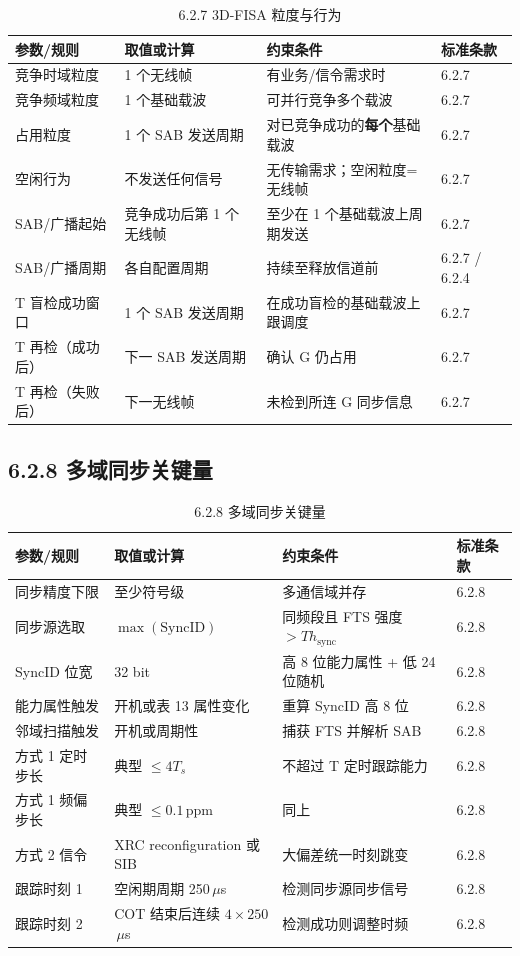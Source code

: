 \documentclass[11pt,a4paper]{ctexart}
\begin{document}
\begin{longtable}{L{3.2cm}L{3.5cm}L{5cm}L{2cm}}
\caption{6.2.7 3D-FISA 粒度与行为\label{tab:627-fisa}} \\
\toprule
\textbf{参数/规则} & \textbf{取值或计算} & \textbf{约束条件} & \textbf{标准条款} \\
\midrule
竞争时域粒度 & 1 个无线帧 & 有业务/信令需求时 & 6.2.7 \\
竞争频域粒度 & 1 个基础载波 & 可并行竞争多个载波 & 6.2.7 \\
占用粒度 & 1 个 SAB 发送周期 & 对已竞争成功的\textbf{每个}基础载波 & 6.2.7 \\
空闲行为 & 不发送任何信号 & 无传输需求；空闲粒度=无线帧 & 6.2.7 \\
SAB/广播起始 & 竞争成功后第 1 个无线帧 & 至少在 1 个基础载波上周期发送 & 6.2.7 \\
SAB/广播周期 & 各自配置周期 & 持续至释放信道前 & 6.2.7 / 6.2.4 \\
T 盲检成功窗口 & 1 个 SAB 发送周期 & 在成功盲检的基础载波上跟调度 & 6.2.7 \\
T 再检（成功后） & 下一 SAB 发送周期 & 确认 G 仍占用 & 6.2.7 \\
T 再检（失败后） & 下一无线帧 & 未检到所连 G 同步信息 & 6.2.7 \\
\bottomrule
\end{longtable}

\subsection{6.2.8 多域同步关键量}

\begin{longtable}{L{3.2cm}L{4cm}L{5cm}L{2cm}}
\caption{6.2.8 多域同步关键量\label{tab:628-sync}} \\
\toprule
\textbf{参数/规则} & \textbf{取值或计算} & \textbf{约束条件} & \textbf{标准条款} \\
\midrule
同步精度下限 & 至少符号级 & 多通信域并存 & 6.2.8 \\
同步源选取 & $\max(\mathrm{SyncID})$ & 同频段且 FTS 强度 $>Th_{\mathrm{sync}}$ & 6.2.8 \\
SyncID 位宽 & 32 bit & 高 8 位能力属性 + 低 24 位随机 & 6.2.8 \\
能力属性触发 & 开机或表 13 属性变化 & 重算 SyncID 高 8 位 & 6.2.8 \\
邻域扫描触发 & 开机或周期性 & 捕获 FTS 并解析 SAB & 6.2.8 \\
方式 1 定时步长 & 典型 $\le 4T_s$ & 不超过 T 定时跟踪能力 & 6.2.8 \\
方式 1 频偏步长 & 典型 $\le 0.1$\,ppm & 同上 & 6.2.8 \\
方式 2 信令 & XRC reconfiguration 或 SIB & 大偏差统一时刻跳变 & 6.2.8 \\
跟踪时刻 1 & 空闲期周期 250\,$\mu$s & 检测同步源同步信号 & 6.2.8 \\
跟踪时刻 2 & COT 结束后连续 $4\times 250$\,$\mu$s & 检测成功则调整时频 & 6.2.8 \\
\bottomrule
\end{longtable}
\end{document}
